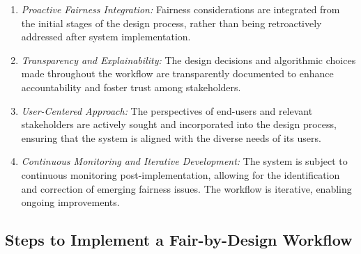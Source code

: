 \documentclass[12pt,a4paper,openright,twoside]{book}
\begin{document}
\begin{enumerate}
    \item \emph{Proactive Fairness Integration:} Fairness considerations are integrated from the initial stages of the design process, rather than being retroactively addressed after system implementation.

    \item \emph{Transparency and Explainability:} The design decisions and algorithmic choices made throughout the workflow are transparently documented to enhance accountability and foster trust among stakeholders.

    \item \emph{User-Centered Approach:} The perspectives of end-users and relevant stakeholders are actively sought and incorporated into the design process, ensuring that the system is aligned with the diverse needs of its users.

    \item \emph{Continuous Monitoring and Iterative Development:} The system is subject to continuous monitoring post-implementation, allowing for the identification and correction of emerging fairness issues. The workflow is iterative, enabling ongoing improvements.
\end{enumerate}

\subsection{Steps to Implement a Fair-by-Design Workflow}
\end{document}
